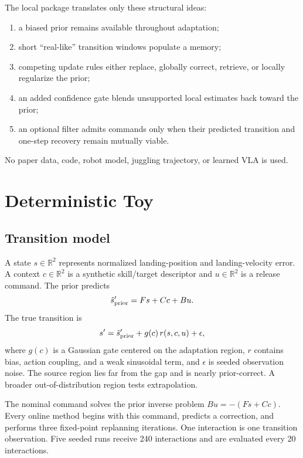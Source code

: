 \documentclass[11pt]{article}
\begin{document}
The local package translates only these structural ideas:
\begin{enumerate}[leftmargin=1.5em]
  \item a biased prior remains available throughout adaptation;
  \item short ``real-like'' transition windows populate a memory;
  \item competing update rules either replace, globally correct, retrieve, or locally regularize the prior;
  \item an added confidence gate blends unsupported local estimates back toward the prior;
  \item an optional filter admits commands only when their predicted transition and one-step recovery remain mutually viable.
\end{enumerate}
No paper data, code, robot model, juggling trajectory, or learned VLA is used.

\section{Deterministic Toy}

\subsection{Transition model}

A state $s\in\mathbb{R}^2$ represents normalized landing-position and landing-velocity error. A context $c\in\mathbb{R}^2$ is a synthetic skill/target descriptor and $u\in\mathbb{R}^2$ is a release command. The prior predicts
\begin{equation}
  \hat{s}'_{\rm prior}=F s+C c+B u.
\end{equation}
The true transition is
\begin{equation}
  s'=\hat{s}'_{\rm prior}+g(c)\,r(s,c,u)+\epsilon,
\end{equation}
where $g(c)$ is a Gaussian gate centered on the adaptation region, $r$ contains bias, action coupling, and a weak sinusoidal term, and $\epsilon$ is seeded observation noise. The source region lies far from the gap and is nearly prior-correct. A broader out-of-distribution region tests extrapolation.

The nominal command solves the prior inverse problem $Bu=-(Fs+Cc)$. Every online method begins with this command, predicts a correction, and performs three fixed-point replanning iterations. One interaction is one transition observation. Five seeded runs receive 240 interactions and are evaluated every 20 interactions.
\end{document}

